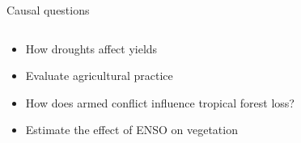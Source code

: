 \documentclass{beamer}
\begin{document}
\begin{frame}{Causal questions}
  \begin{columns}
    \begin{column}{0.5\textwidth}
      \begin{itemize}[<+-|alert@+>]
	\item How droughts affect yields 
	\item Evaluate agricultural practice \citep{tsoumas2023evaluating, Giannarakis_2022_CVPR} 
	\item How does armed conflict influence tropical forest loss? \citep{Christiansen03042022} 
	\item Estimate the effect of ENSO on vegetation \citep{le2023increased} 
      \end{itemize}
    \end{column}
    \begin{column}{0.5\textwidth}
\end{column}
\end{columns}
\end{frame}
\end{document}
